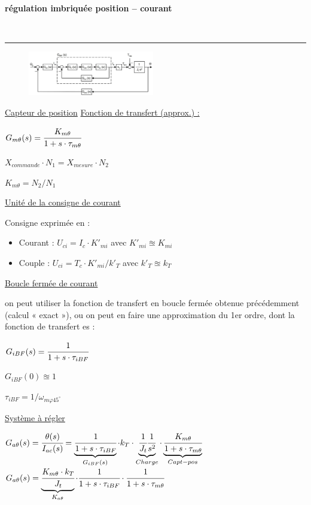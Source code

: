 \documentclass[	DIV=calc,%
							paper=a4,%
							fontsize=10pt,%
							twocolumn]{scrartcl} %
\newcounter{mycounter}
\newcommand{\formdesc}[1]{\large\textbf{#1} \addtocounter{mycounter}{1} \hfill \themycounter \\ \vspace{-3mm} \hrule \vspace{2mm}}
\newcommand{\formtitle}[1]{\large\underline{#1}}
\begin{document}
\formdesc{régulation imbriquée position – courant}
\begin{figure}[H]
    \begin{center}
        \includegraphics[width = 0.49\textwidth]{img/Regulation_courrant_pos.JPG}
    \end{center}
\end{figure}

\formtitle{Capteur de position}
\underline{Fonction de transfert  (approx.) :}

\vspace{3mm}
$G_{m\theta}(s) = \cfrac{K_{m\theta}}{1+s\cdot\tau_{m\theta}} $

$X_{commande} \cdot N_1 = X_{mesure} \cdot N_2$

$K_{m\theta} = N_2/N_1$

\underline{Unité de la consigne de courant}

Consigne exprimée en : 
\begin{itemize}
    \item Courant : $U_{ci} = I_c \cdot K'_{mi}$ avec $K'_{mi} \approxeq K_{mi}$
    \item Couple  : $U_{ci} = T_c \cdot K'_{mi}/k'_T$ avec $k'_T \approxeq k _T$
\end{itemize}


\underline{Boucle fermée de courant}

on peut utiliser la fonction de transfert en boucle fermée obtenue 
précédemment (calcul « exact »), ou on peut en faire une approximation du 1er ordre, dont la fonction de 
transfert es :

$G_{iBF}(s) = \cfrac{1}{1+s\cdot\tau_{iBF}} $

$G_{iBF}(0) \approxeq 1$

 $\tau_{iBF} = 1/ \omega_{m\varphi 45^\circ}$ 

\underline{Système à régler}

$G_{a\theta}(s) = \cfrac{\theta(s)}{I_{ac}(s)} = \underbrace{\cfrac{1}{1+s\cdot\tau_{iBF}}}_{G_{iBF}(s)}\cdot k_T \cdot \underbrace{\cfrac{1}{J_t}\cfrac{1}{s^2}}_{Charge} \cdot \underbrace{\cfrac{K_{m\theta}}{1+s\cdot\tau_{m\theta}}}_{Capt-pos} $ 
$G_{a\theta}(s) = \underbrace{\cfrac{K_{m\theta} \cdot k_T}{J_t}}_{K_{a\theta} }\cdot \cfrac{1}{1+s\cdot\tau_{iBF}} \cdot \cfrac{1}{1+s\cdot\tau_{m\theta}}$
\end{document}
